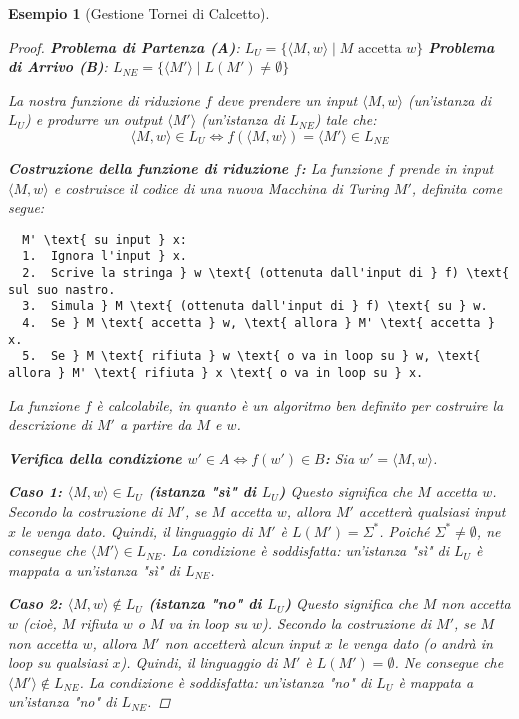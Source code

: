 \documentclass[a4paper]{article}
\newtheorem{example}[theorem]{Esempio}
\begin{document}
\begin{example}[Gestione Tornei di Calcetto]
\begin{proof}
\textbf{Problema di Partenza (A)}: $L_U = \{ \langle M, w \rangle \mid M \text{ accetta } w \}$
\textbf{Problema di Arrivo (B)}: $L_{NE} = \{ \langle M' \rangle \mid L(M') \neq \emptyset \}$

La nostra funzione di riduzione $f$ deve prendere un input $\langle M, w \rangle$ (un'istanza di $L_U$) e produrre un output $\langle M' \rangle$ (un'istanza di $L_{NE}$) tale che:
\[
\langle M, w \rangle \in L_U \iff f(\langle M, w \rangle) = \langle M' \rangle \in L_{NE}
\]

\textbf{Costruzione della funzione di riduzione $f$:}
La funzione $f$ prende in input $\langle M, w \rangle$ e costruisce il codice di una nuova Macchina di Turing $M'$, definita come segue:

\begin{verbatim}
  M' \text{ su input } x:
  1.  Ignora l'input } x.
  2.  Scrive la stringa } w \text{ (ottenuta dall'input di } f) \text{ sul suo nastro.
  3.  Simula } M \text{ (ottenuta dall'input di } f) \text{ su } w.
  4.  Se } M \text{ accetta } w, \text{ allora } M' \text{ accetta } x.
  5.  Se } M \text{ rifiuta } w \text{ o va in loop su } w, \text{ allora } M' \text{ rifiuta } x \text{ o va in loop su } x.
\end{verbatim}

La funzione $f$ è calcolabile, in quanto è un algoritmo ben definito per costruire la descrizione di $M'$ a partire da $M$ e $w$.

\textbf{Verifica della condizione $w' \in A \iff f(w') \in B$:}
Sia $w' = \langle M, w \rangle$.

\textbf{Caso 1: $\langle M, w \rangle \in L_U$ (istanza "sì" di $L_U$)}
Questo significa che $M$ accetta $w$.
Secondo la costruzione di $M'$, se $M$ accetta $w$, allora $M'$ accetterà \emph{qualsiasi} input $x$ le venga dato.
Quindi, il linguaggio di $M'$ è $L(M') = \Sigma^*$.
Poiché $\Sigma^* \neq \emptyset$, ne consegue che $\langle M' \rangle \in L_{NE}$.
La condizione è soddisfatta: un'istanza "sì" di $L_U$ è mappata a un'istanza "sì" di $L_{NE}$.

\textbf{Caso 2: $\langle M, w \rangle \notin L_U$ (istanza "no" di $L_U$)}
Questo significa che $M$ non accetta $w$ (cioè, $M$ rifiuta $w$ o $M$ va in loop su $w$).
Secondo la costruzione di $M'$, se $M$ non accetta $w$, allora $M'$ non accetterà \emph{alcun} input $x$ le venga dato (o andrà in loop su qualsiasi $x$).
Quindi, il linguaggio di $M'$ è $L(M') = \emptyset$.
Ne consegue che $\langle M' \rangle \notin L_{NE}$.
La condizione è soddisfatta: un'istanza "no" di $L_U$ è mappata a un'istanza "no" di $L_{NE}$.


\end{proof}
\end{example}
\end{document}
